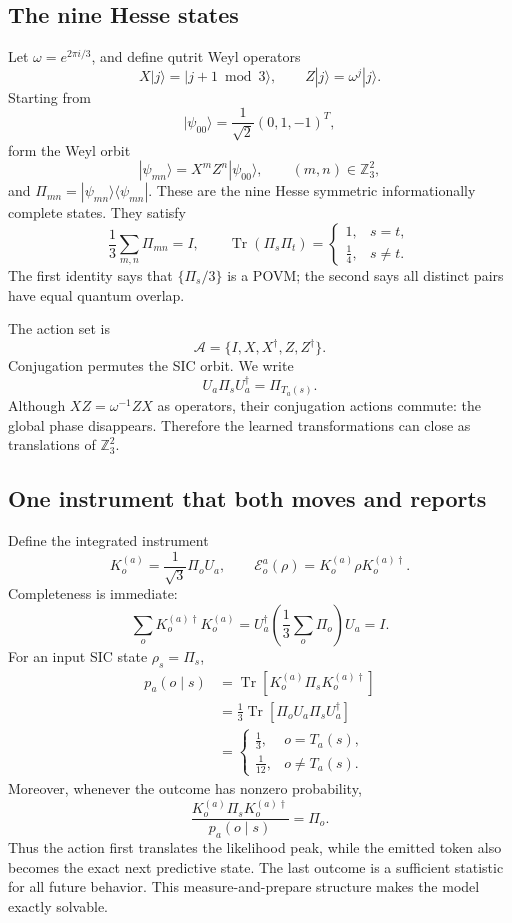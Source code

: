\documentclass[11pt]{article}
\theoremstyle{definition}
\theoremstyle{remark}
\newcommand{\cA}{\mathcal A}
\newcommand{\cE}{\mathcal E}
\newcommand{\Tr}{\operatorname{Tr}}
\newcommand{\Z}{\mathbb Z}
\begin{document}
\subsection{The nine Hesse states}

Let \(\omega=e^{2\pi i/3}\), and define qutrit Weyl operators
\[
X|j\rangle=|j+1\bmod3\rangle,\qquad
Z|j\rangle=\omega^j|j\rangle.
\]
Starting from
\[
|\psi_{00}\rangle=\frac1{\sqrt2}(0,1,-1)^T,
\]
form the Weyl orbit
\[
|\psi_{mn}\rangle=X^mZ^n|\psi_{00}\rangle,\qquad
(m,n)\in\Z_3^2,
\]
and \(\Pi_{mn}=|\psi_{mn}\rangle\langle\psi_{mn}|\). These are the nine
Hesse symmetric informationally complete states. They satisfy
\begin{equation}
\label{eq:sic}
\frac13\sum_{m,n}\Pi_{mn}=I,\qquad
\Tr(\Pi_s\Pi_t)=
\begin{cases}
1,&s=t,\\
\frac14,&s\ne t.
\end{cases}
\end{equation}
The first identity says that \(\{\Pi_s/3\}\) is a POVM; the second says all
distinct pairs have equal quantum overlap.

The action set is
\[
\cA=\{I,X,X^\dagger,Z,Z^\dagger\}.
\]
Conjugation permutes the SIC orbit. We write
\[
U_a\Pi_sU_a^\dagger=\Pi_{T_a(s)}.
\]
Although \(XZ=\omega^{-1}ZX\) as operators, their conjugation actions commute:
the global phase disappears. Therefore the learned transformations can close
as translations of \(\Z_3^2\).

\subsection{One instrument that both moves and reports}

Define the integrated instrument
\begin{equation}
\label{eq:hesse-instrument}
K_o^{(a)}=\frac1{\sqrt3}\Pi_oU_a,\qquad
\cE_o^a(\rho)=K_o^{(a)}\rho K_o^{(a)\dagger}.
\end{equation}
Completeness is immediate:
\[
\sum_oK_o^{(a)\dagger}K_o^{(a)}
=U_a^\dagger\left(\frac13\sum_o\Pi_o\right)U_a=I.
\]
For an input SIC state \(\rho_s=\Pi_s\),
\begin{align}
p_a(o\mid s)
&=\Tr[K_o^{(a)}\Pi_sK_o^{(a)\dagger}]\\
&=\frac13\Tr[\Pi_oU_a\Pi_sU_a^\dagger]\\
&=\begin{cases}
\frac13,&o=T_a(s),\\[2pt]
\frac1{12},&o\ne T_a(s).
\end{cases}
\label{eq:hesse-likelihood}
\end{align}
Moreover, whenever the outcome has nonzero probability,
\[
\frac{K_o^{(a)}\Pi_sK_o^{(a)\dagger}}{p_a(o\mid s)}=\Pi_o.
\]
Thus the action first translates the likelihood peak, while the emitted token
also becomes the exact next predictive state. The last outcome is a sufficient
statistic for all future behavior. This measure-and-prepare structure makes
the model exactly solvable.
\end{document}
